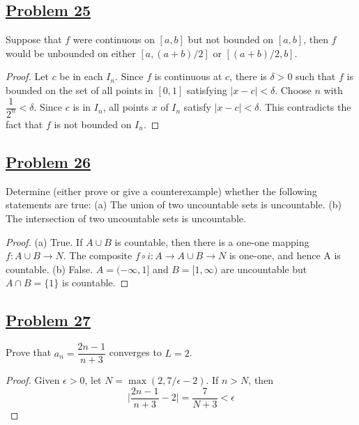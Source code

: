 \documentclass[10pt,letterpaper]{article}
\begin{document}
	\subsection*{{\color{purple}\underline{Problem 25}}}
	Suppose that $f$ were continuous on $[a, b]$ but not bounded on $[a, b]$, then $f$ would
	be unbounded on either $[a, (a+b)/2]$ or $[(a + b)/2, b]$. 
	\begin{proof}
	Let $c$ be in each $I_n$. Since $f$ is continuous at $c$, there is $\delta > 0$ such that
	$f$ is bounded on the set of all points in $[0, 1]$ satisfying $|x - c| < \delta$. 
	Choose $n$ with $\dfrac{1}{2^n} < \delta$. Since $c$ is in $I_n$, all points
	$x$ of $I_n$ satisfy $|x - c| < \delta$. This contradicts the fact that $f$
	is not bounded on $I_n$.
	\end{proof}
	
	\subsection*{{\color{purple}\underline{Problem 26}}}
	Determine (either prove or give a counterexample) whether the following statements are true: (a) The union of two
uncountable sets is uncountable. (b) The intersection of two uncountable sets is uncountable.
	\begin{proof}
	(a) True. If $A \cup B$ is countable, then there is a one-one mapping $f : A \cup B \rightarrow N$. 
	The composite $f \circ i : A \rightarrow
A \cup B \rightarrow N$ is one-one, and hence A is countable. 
(b) False. $A = (−\infty, 1]$ and $B = [1, \infty)$ are uncountable but $A \cap B = \{1\}$ is countable.
	\end{proof}
	
	\subsection*{{\color{purple}\underline{Problem 27}}}
	Prove that $a_n = \dfrac{2n - 1}{n + 3}$ converges to $L = 2$.
	\begin{proof}
	Given $\epsilon > 0$, let $N = \max(2, 7/\epsilon - 2)$. If $n > N$, then
	$$\bigg|\dfrac{2n - 1}{n + 3} - 2\bigg| = \dfrac{7}{N + 3} < \epsilon$$
	\end{proof}		
	
	
\end{document}
